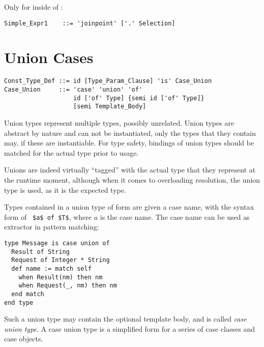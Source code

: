 Only for  inside of :
\begin{lstlisting}
Simple_Expr1    ::= 'joinpoint' ['.' Selection]
\end{lstlisting}







\section{Union Cases}
\label{sec:unions}

\syntax\begin{lstlisting}
Const_Type_Def ::= id [Type_Param_Clause] 'is' Case_Union
Case_Union     ::= 'case' 'union' 'of' 
                   id ['of' Type] {semi id ['of' Type]}
                   [semi Template_Body]
\end{lstlisting}

Union types represent multiple types, possibly unrelated. Union types are abstract by nature and can not be instantiated, only the types that they contain may, if these are instantiable. For type safety, bindings of union types should be matched for the actual type prior to usage. 

Unions are indeed virtually ``tagged'' with the actual type that they represent at the runtime moment, although when it comes to overloading resolution, the union type is used, as it is the expected type. 

Types contained in a union type of form  are given a case name, with the syntax form of ~\lstinline!$a$ of $T$!, where $a$ is the case name. The case name can be used as extractor in pattern matching:
\begin{lstlisting}
type Message is case union of 
  Result of String
  Request of Integer * String
  def name := match self 
    when Result(nm) then nm
    when Request(_, nm) then nm
  end match
end type
\end{lstlisting}
Such a union type may contain the optional template body, and is called {\em case union type}. A case union type is a simplified form for a series of case classes and case objects. 







